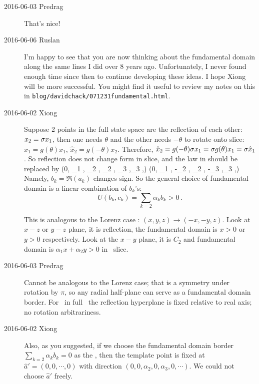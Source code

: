 \begin{description}
\item[2016-06-03 Predrag]
That's nice!

\item[2016-06-06 Ruslan] I'm happy to see that you are now
thinking about the fundamental domain along the same lines I did
over 8 years ago.  Unfortunately, I never found enough time since then to
continue developing these ideas.  I hope Xiong will be more successful.
You might find it useful to review my notes on this in
{\tt blog/davidchack/071231fundamental.html}.

\item[2016-06-02 Xiong]
Suppose 2 points in the full state space are
the reflection of each other: $x_2 = \sigma x_1$, then one needs $\theta$
and the other needs $-\theta$ to rotate onto slice:
$\hat{x}_1 =g(\theta)x_1$, $\hat{x}_2 =g(-\theta)x_2$. Therefore,
$\hat{x}_2 =g(-\theta)\sigma x_1 = \sigma g(\theta)x_1 = \sigma\hat{x}_1$. So
reflection does not change form in slice, and the law in
 should be replaced by
\beq
  (0, _1 , _2 , _2 , _3 ,_3 ,\cdots)
  \to
  (0, _1 , -_2 , _2 , -_3 ,_3 ,\cdots)
Namely, $b_k = \Re(a_k)$ changes sign. So the general choice of fundamental
domain is a linear combination of $b_k$'s:
\begin{equation}
  \label{eq:ksfundDomain}
  U(b_k, c_k) = \sum_{k=2}\alpha_k b_k >0 \,.
\end{equation}

This is analogous to the Lorenz case : $(x, y, z)\to (-x,-y, z)$.
Look at $x-z$ or $y-z$ plane, it is reflection, the fundamental
domain is $x>0$ or $y>0$ respectively. Look at the $x-y$ plane,
it is $C_2$ and fundamental domain is $\alpha_1 x + \alpha_2 y >0$
in \KSe\ slice.

\item[2016-06-03 Predrag]
Cannot be analogous to the Lorenz case; that is a symmetry
under rotation by $\pi$, so any radial half-plane can serve
as a fundamental domain border. For \KS\ in full \statesp\
the reflection hyperplane is fixed relative to real axis;
no rotation arbitrariness.

\item[2016-06-02 Xiong]
Also, as you suggested, if we choose the
fundamental domain border $\sum_{k=2}\alpha_k b_k =0$ as the
\PoincSec, then the template point is fixed at
$\hat{a}'= (0, 0,\cdots, 0)$
with direction $(0, 0, \alpha_2, 0, \alpha_3, 0, \cdots)$. We could not
choose $\hat{a}'$ freely.



\end{description}

